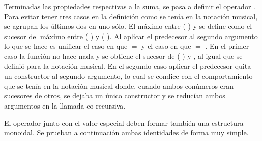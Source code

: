 Terminadas las propiedades respectivas a la suma, se pasa a definir el operador . Para evitar tener tres casos en la definición como se tenía en la notación musical, se agrupan los últimos dos en uno sólo. El máximo entre ( ) y  se define como el sucesor del máximo entre ( ) y ( ). Al aplicar el predecesor al segundo argumento lo que se hace es unificar el caso en que  $=$  y el caso en que  $=$  . En el primer caso la función  no hace nada y se obtiene el sucesor de ( ) y , al igual que se definió para la notación musical. En el segundo caso aplicar el predecesor quita un constructor  al segundo argumento, lo cual se condice con el comportamiento que se tenía en la notación musical donde, cuando ambos conúmeros eran sucesores de otros, se dejaba un único constructor  y se reducían ambos argumentos en la llamada co-recursiva.

El operador  junto con el valor especial  deben formar también una estructura monoidal. Se prueban a continuación ambas identidades de forma muy simple. 

